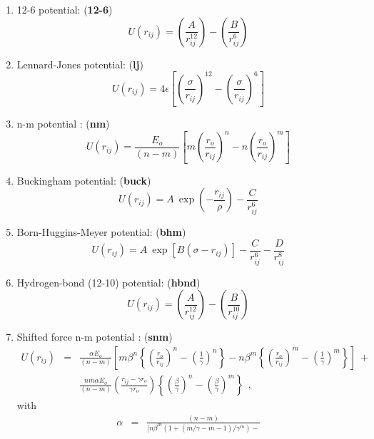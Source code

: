 \begin{enumerate}
\item 12-6 potential:  ({\bf 12-6})
\begin{equation}
U(r_{ij}) =
\left(\frac{A}{r_{ij}^{12}}\right)-\left(\frac{B}{r_{ij}^{6}}\right)
\end{equation}
\item Lennard-Jones potential:  ({\bf lj})
\begin{equation}
U(r_{ij}) = 4\epsilon\left[\left
(\frac{\sigma}{r_{ij}}\right)^{12}-\left(\frac{\sigma}{r_{ij}}\right)^{6}\right]
\end{equation}
\item n-m potential \cite{clarke-86a}:  ({\bf nm})
\begin{equation}
U(r_{ij}) = \frac{E_{o}}{(n-m)}\left[m\left
(\frac{r_{o}}{r_{ij}}\right)^{n}-n\left(\frac{r_{o}}{r_{ij}}\right)^{m}\right]
\end{equation}
\item Buckingham potential:  ({\bf buck})
\begin{equation}
U(r_{ij}) =
A~\exp\left(-\frac{r_{ij}}{\rho}\right)-\frac{C}{r_{ij}^{6}}
\end{equation}
\item Born-Huggins-Meyer potential:  ({\bf bhm})
\begin{equation}
U(r_{ij}) =
A~\exp[B(\sigma-r_{ij})]-\frac{C}{r_{ij}^{6}}-\frac{D}{r_{ij}^{8}}
\end{equation}
\item Hydrogen-bond (12-10) potential:  ({\bf hbnd})
\begin{equation}
U(r_{ij}) =
\left(\frac{A}{r_{ij}^{12}}\right)-\left(\frac{B}{r_{ij}^{10}}\right)
\end{equation}
\item Shifted force n-m potential \cite{clarke-86a}:  ({\bf snm})
\begin{eqnarray}
U(r_{ij})&=&\frac{\alpha E_{o}}{(n-m)}\left [
m\beta^{n}\left \{ \left (\frac{r_{o}}{r_{ij}}\right )^{n}-
\left(\frac{1}{\gamma}\right)^{n}\right \}-
n\beta^{m}\left \{ \left (\frac{r_{o}}{r_{ij}}\right )^{m}-
\left(\frac{1}{\gamma}\right)^{m}\right \} \right ]~+~\phantom{xxxx} \nonumber \\
& & \frac{nm\alpha E_{o}}{(n-m)} \left ( \frac{r_{ij}-\gamma r_{o}}{\gamma r_{o}}
\right )\left\{\left(\frac{\beta}{\gamma}\right
)^{n}-\left(\frac{\beta}{\gamma}\right )^{m}\right \}~~,
\end{eqnarray}
with
\begin{eqnarray}
\alpha&=&\frac{(n-m)}{[n\beta^{m}(1+(m/\gamma-m-1)/\gamma^{m})-
}
\end{eqnarray}
\end{enumerate}
